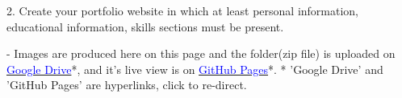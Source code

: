 \documentclass{article}
\begin{document}
2. Create your portfolio website in which at least personal information, educational
information, skills sections must be present.

- Images are produced here on this page and the folder(zip file) is uploaded on \href{https://www.example.com/}{\textcolor{blue}{Google Drive}}*, and it's live view is on \href{https://hexronuspi.github.io/Team405NITP/}{\textcolor{blue}{GitHub Pages}}*. 
*
'Google Drive' and 'GitHub Pages' are hyperlinks, click to re-direct. 
\end{document}
